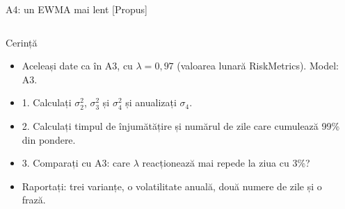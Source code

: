 \begin{frame}{A4: un EWMA mai lent [Propus]}
\propsub
\itemsize{\scriptsize}
\begin{columns}[T]
\begin{column}{\taskw}
\begin{block}{Cerință}
\begin{itemize}
    \item Aceleași date ca în A3, cu $\lambda = 0{,}97$ (valoarea lunară RiskMetrics). Model: A3.
    \item 1. Calculați $\sigma_2^2$, $\sigma_3^2$ și $\sigma_4^2$ și anualizați $\sigma_4$.
    \item 2. Calculați timpul de înjumătățire și numărul de zile care cumulează 99\% din pondere.
    \item 3. Comparați cu A3: care $\lambda$ reacționează mai repede la ziua cu 3\%?
    \item Raportați: trei varianțe, o volatilitate anuală, două numere de zile și o frază.
\end{itemize}
\end{block}
\end{column}
\begin{column}{\solw}
\end{column}
\end{columns}
\end{frame}

